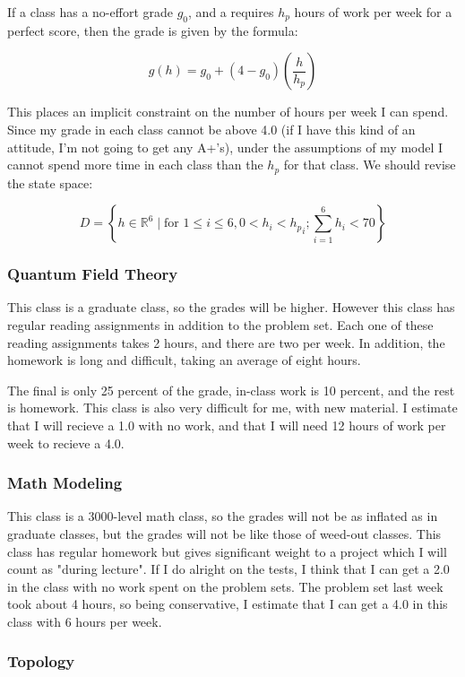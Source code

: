 \documentclass{article}
\begin{document}
If a class has a no-effort grade $g_0$, and a requires $h_p$ hours of work per week for a
	perfect score, then the grade is given by the formula:

\[ g(h) = g_0 + (4 - g_0) \left( \frac{h}{h_p} \right) \]

This places an implicit constraint on the number of hours per week I can spend.
Since my grade in each class cannot be above 4.0 (if I have this kind of an attitude,
	I'm not going to get any A+'s), under the assumptions of my model I cannot
	spend more time in each class than the $h_p$ for that class.
We should revise the state space:

\[ D = \left\{ h \in \mathbb{R}^6 \mid \text{for } 1 \leq i \leq 6, 0 < h_i < {h_p}_i; 
	\sum_{i=1}^6 h_i < 70 \right\} \]




\subsubsection{Quantum Field Theory}

This class is a graduate class, so the grades will be higher.
However this class has regular reading assignments in addition to the problem set.
Each one of these reading assignments takes 2 hours, and there are two per week.
In addition, the homework is long and difficult, taking an average of eight hours.

The final is only 25 percent of the grade, in-class work is 10 percent, and the rest is homework.
This class is also very difficult for me, with new material.
I estimate that I will recieve a 1.0 with no work, and that I will need 12 hours
	of work per week to recieve a 4.0.

\subsubsection{Math Modeling}

This class is a 3000-level math class, so the grades will not be as 
	inflated as in graduate classes, but the grades will not be like
	those of weed-out classes.
This class has regular homework but gives significant weight to a project which
	I will count as "during lecture".
If I do alright on the tests, I think that I can get a 2.0 in the class with
	no work spent on the problem sets.
The problem set last week took about 4 hours, so being conservative, I estimate 
	that I can get a 4.0 in this class with 6 hours per week.

\subsubsection{Topology}
\end{document}
